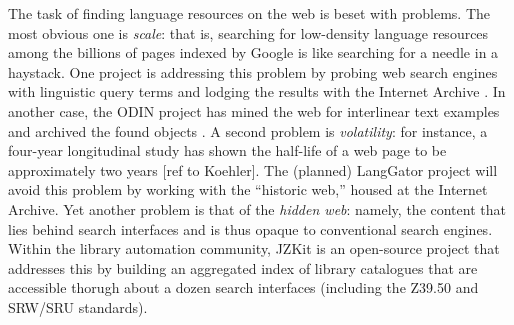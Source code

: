 The task of finding language resources on the web is beset with
problems.  The most obvious one is \emph{scale}: that is, searching for
low-density language resources among the billions of pages indexed
by Google is like searching for a needle in a haystack.  One project is
addressing this problem by probing web search engines with linguistic
query terms and lodging the results with the Internet Archive
\citep{BaldwinBird06}. In another case, the ODIN project has mined
the web for interlinear text examples and archived the found objects
\citep{Langendoen02,Lewis03}.  A second problem is \emph{volatility}:
for instance, a four-year longitudinal study has shown the half-life
of a web page to be approximately two years [ref to Koehler].
The (planned) LangGator project will avoid this problem by working
with the ``historic web,'' housed at the Internet Archive.  Yet
another problem is that of the
\emph{hidden web}: namely, the content that lies behind search
interfaces and is thus opaque to conventional search engines.
Within the library automation community, JZKit is an open-source project
that addresses this by building an aggregated index of library
catalogues that are accessible thorugh about a dozen search interfaces
(including the Z39.50 and SRW/SRU standards).



